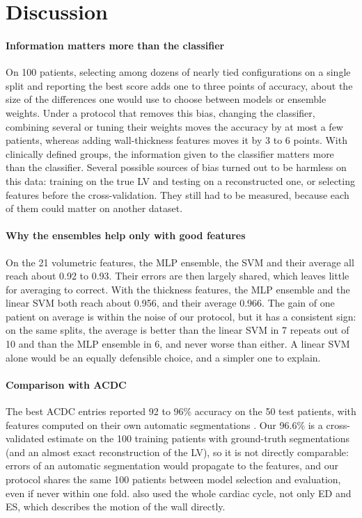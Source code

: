 \section{Discussion}
\paragraph{Information matters more than the classifier}
On 100 patients, selecting among dozens of nearly tied configurations on a single split and reporting the best score adds one to three points of accuracy, about the size of the differences one would use to choose between models or ensemble weights. Under a protocol that removes this bias, changing the classifier, combining several or tuning their weights moves the accuracy by at most a few patients, whereas adding wall-thickness features moves it by 3 to 6 points. With clinically defined groups, the information given to the classifier matters more than the classifier. Several possible sources of bias turned out to be harmless on this data: training on the true LV and testing on a reconstructed one, or selecting features before the cross-validation. They still had to be measured, because each of them could matter on another dataset.

\paragraph{Why the ensembles help only with good features}
On the 21 volumetric features, the MLP ensemble, the SVM and their average all reach about 0.92 to 0.93. Their errors are then largely shared, which leaves little for averaging to correct. With the thickness features, the MLP ensemble and the linear SVM both reach about 0.956, and their average 0.966. The gain of one patient on average is within the noise of our protocol, but it has a consistent sign: on the same splits, the average is better than the linear SVM in 7 repeats out of 10 and than the MLP ensemble in 6, and never worse than either. A linear SVM alone would be an equally defensible choice, and a simpler one to explain.

\paragraph{Comparison with ACDC}
The best ACDC entries reported 92 to 96\% accuracy on the 50 test patients, with features computed on their own automatic segmentations \citep{bernard2018,isensee2017,khened2017}. Our 96.6\% is a cross-validated estimate on the 100 training patients with ground-truth segmentations (and an almost exact reconstruction of the LV), so it is not directly comparable: errors of an automatic segmentation would propagate to the features, and our protocol shares the same 100 patients between model selection and evaluation, even if never within one fold. \citet{isensee2017} also used the whole cardiac cycle, not only ED and ES, which describes the motion of the wall directly.

